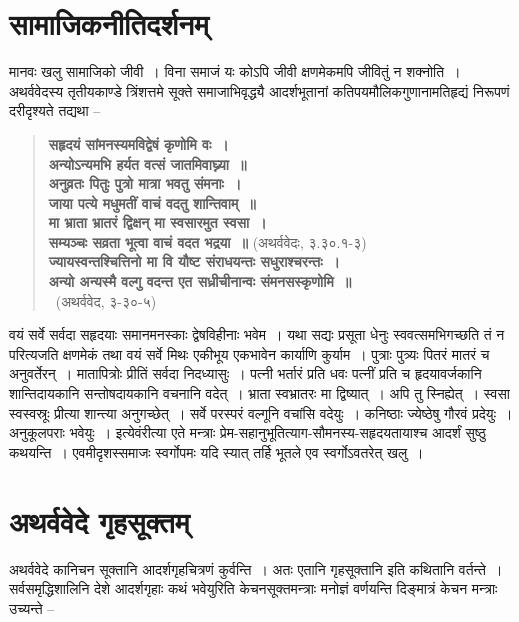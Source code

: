 \section{सामाजिकनीतिदर्शनम्}

मानवः खलु सामाजिको जीवी~। विना समाजं यः कोऽपि जीवी क्षणमेकमपि जीवितुं न शक्नोति~। अथर्ववेदस्य तृतीयकाण्डे त्रिंशत्तमे सूक्ते समाजाभिवृद्ध्यै आदर्शभूतानां कतिपयमौलिकगुणानामतिहृद्यं निरूपणं दरीदृश्यते तद्यथा –

\begin{verse}
\textbf{सहृदयं सांमनस्यमविद्वेषं कृणोमि वः~।}\\
\textbf{अन्योऽन्यमभि हर्यत वत्सं जातमिवाघ्न्या~॥}\\
\textbf{अनुव्रतः पितुः पुत्रो मात्रा भवतु संमनाः~।}\\
\textbf{जाया पत्ये मधुमतीं वाचं वदतु शान्तिवाम्~॥}\\
\textbf{मा भ्राता भ्रातरं द्विक्षन् मा स्वसारमुत स्वसा~।}\\
\textbf{सम्यञ्चः सव्रता भूत्वा वाचं वदत भद्रया~॥} (अथर्ववेदः, ३.३०.१-३)\\
\textbf{ज्यायस्वन्तश्चित्तिनो मा वि यौष्ट संराधयन्तः सधुराश्चरन्तः~।}\\
\textbf{अन्यो अन्यस्मै वल्गु वदन्त एत सध्रीचीनान्वः संमनसस्कृणोमि~॥}\\ 
~\hfill(अथर्ववेद, ३-३०-५)
\end{verse}

वयं सर्वे सर्वदा सहृदयाः समानमनस्काः द्वेषविहीनाः भवेम~। यथा सद्यः प्रसूता धेनुः स्ववत्समभिगच्छति तं न परित्यजति क्षणमेकं तथा वयं सर्वे मिथः एकीभूय एकभावेन कार्याणि कुर्याम~। पुत्राः पुत्र्यः पितरं मातरं च अनुवर्तेरन्~। मातापित्रोः प्रीतिं सर्वदा निदध्यासुः~। पत्नी भर्तारं प्रति धवः पत्नीं प्रति च हृदयावर्जकानि शान्तिदायकानि सन्तोषदायकानि वचनानि वदेत्~। भ्राता स्वभ्रातरः मा द्विष्यात्~। अपि तु स्निह्येत्~। स्वसा स्वस्वस्रूः प्रीत्या शान्त्या अनुगच्छेत्~। सर्वे परस्परं वल्गूनि वचांसि वदेयुः~। कनिष्ठाः ज्येष्ठेषु गौरवं प्रदेयुः~। अनुकूलपराः भवेयुः~। इत्येवंरीत्या एते मन्त्राः प्रेम-सहानुभूतित्याग-सौमनस्य-सहृदयतायाश्च आदर्शं सुष्ठु कथयन्ति~। एवमीदृशस्समाजः स्वर्गोपमः यदि स्यात् तर्हि भूतले एव स्वर्गोऽवतरेत् खलु~।


\section*{अथर्ववेदे गृहसूक्तम्}

अथर्ववेदे कानिचन सूक्तानि आदर्शगृहचित्रणं कुर्वन्ति~। अतः एतानि गृहसूक्तानि इति कथितानि वर्तन्ते~। सर्वसमृद्धिशालिनि देशे आदर्शगृहाः कथं भवेयुरिति केचनसूक्तमन्त्राः मनोज्ञं वर्णयन्ति दिङ्मात्रं केचन मन्त्राः उच्यन्ते –

